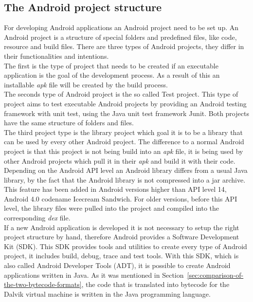 \subsection{The Android project structure}
\label{sec:migration:the-android-project-structure}
For developing Android applications an Android project need to be set up.
An Android project is a structure of special folders and predefined files, like code, resource and build files.
There are three types of Android projects, they differ in their functionalities and intentions.\\
The first is the type of project that needs to be created if an executable application is the goal of the development process.
As a result of this an installable \textit{apk} file will be created by the build process.\\
The seconds type of Android project is the so called Test project.
This type of project aims to test executable Android projects by providing an Android testing framework with unit test, using the Java unit test framework Junit.
Both projects have the same structure of folders and files.\\
The third project type is the library project which goal it is to be a library that can be used by every other Android project.
The difference to a normal Android project is that this project is not being build into an \textit{apk} file, it is being used by other Android projects which pull it in their \textit{apk} and build it with their code.
Depending on the Android API level an Android library differs from a usual Java library, by the fact that the Android library is not compressed into a jar archive.
This feature has been added in Android versions higher than API level 14, Android 4.0 codename Icecream Sandwich.
For older versions, before this API level, the library files were pulled into the project and compiled into the corresponding \textit{dex} file.\\
If a new Android application is developed it is not necessary to setup the right project structure by hand, therefore Android provides a Software Development Kit (SDK).
This SDK provides tools and utilities to create every type of Android project, it includes build, debug, trace and test tools.
With this SDK, which is also called Android Developer Tools (ADT), it is possible to create Android applications written in Java.
As it was mentioned in Section~\ref{sec:comparison-of-the-two-bytecode-formats}, the code that is translated into bytecode for the Dalvik virtual machine is written in the Java programming language.
